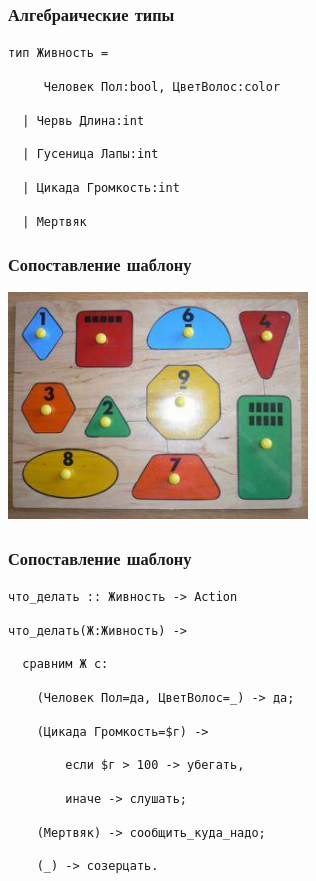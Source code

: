 \documentclass{beamer}
\begin{document}
\begin{frame}[fragile]
  \frametitle{Алгебраические типы}
  \begin{block}{}
    \texttt{{\color{magenta}тип} {\color{blue}Живность} =}
      \pause

      \verb+    +\texttt{{\color{blue} Человек} Пол:{\color{magenta}bool}, ЦветВолос:{\color{magenta}color}}
      \pause

      \verb+  +\texttt{| {\color{blue}Червь} Длина:{\color{magenta}int}}
      \pause

      \verb+  +\texttt{| {\color{blue}Гусеница} Лапы:{\color{magenta}int}}
      \pause

      \verb+  +\texttt{| {\color{blue}Цикада} Громкость:{\color{magenta}int}}
      \pause

      \verb+  +\texttt{| {\color{blue}Мертвяк}}
  \end{block}
\end{frame}

\begin{frame}
  \frametitle{Сопоставление шаблону}
  \begin{center}
    \includegraphics[height=6cm]{pm.png}
  \end{center}
\end{frame}

\begin{frame}[fragile]
  \frametitle{Сопоставление шаблону}
  \begin{block}{}
    \texttt{{\color{red}что\_делать} :: {\color{blue}Живность} -> {\color{blue}Action}}
    \pause

    \texttt{{\color{red}что\_делать}(Ж:{\color{blue}Живность}) ->}

    \verb+  +\texttt{{\color{magenta}сравним} Ж {\color{magenta}с}:}
    \pause

    \verb+    +\texttt{({\color{blue}Человек} Пол={\color{red}да}, ЦветВолос=\_) -> {\color{red}да};}
    \pause

    \verb+    +\texttt{({\color{blue}Цикада} Громкость=\$г) ->}

    \verb+        +\texttt{{\color{magenta}если} \$г > 100 -> {\color{red}убегать},}

    \verb+        +\texttt{{\color{magenta}иначе} -> {\color{red}слушать};}
    \pause

    \verb+    +\texttt{({\color{blue}Мертвяк}) -> {\color{red}сообщить\_куда\_надо};}
    \pause

    \verb+    +\texttt{(\_) -> {\color{red}созерцать}.}
  \end{block}
\end{frame}
\end{document}
